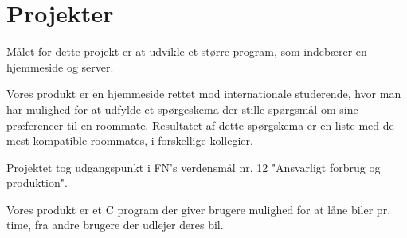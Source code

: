 \documentclass[]{plushcv}
\begin{document}
\begin{minipage}[t]{0.70\textwidth}

\section{Projekter}

\begin{tightemize}
\item Målet for dette projekt er at udvikle et større program, som indebærer en hjemmeside og server.
\item Vores produkt er en hjemmeside rettet mod internationale studerende, hvor man har mulighed for at udfylde et spørgeskema der stille spørgsmål om sine præferencer til en roommate. Resultatet af dette spørgskema er en liste med de mest kompatible roommates, i forskellige kollegier.
\end{tightemize}
\sectionsep

\begin{tightemize}
\item Projektet tog udgangspunkt i FN's verdensmål nr. 12 "Ansvarligt forbrug og produktion".  
\item Vores produkt er et C program der giver brugere mulighed for at låne biler pr. time, fra andre brugere der udlejer deres bil. 
\end{tightemize}
\sectionsep


%
%

\end{minipage} 
\hfill
\end{document}
